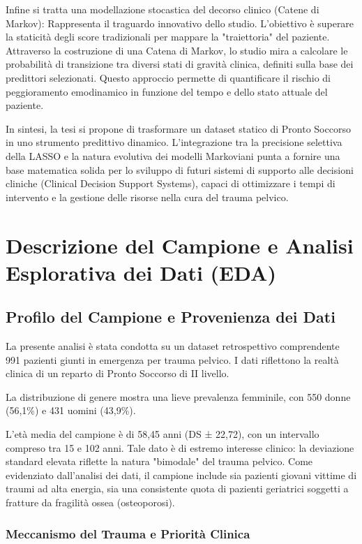\documentclass[11pt, oneside, noexaminfo]{sapthesis}   	%
\begin{document}
Infine si tratta una modellazione stocastica del decorso clinico (Catene di Markov): Rappresenta il traguardo innovativo dello studio. L'obiettivo è superare la staticità degli score tradizionali per mappare la "traiettoria" del paziente. Attraverso la costruzione di una Catena di Markov, lo studio mira a calcolare le probabilità di transizione tra diversi stati di gravità clinica, definiti sulla base dei predittori selezionati. Questo approccio permette di quantificare il rischio di peggioramento emodinamico in funzione del tempo e dello stato attuale del paziente.

In sintesi, la tesi si propone di trasformare un dataset statico di Pronto Soccorso in uno strumento predittivo dinamico. L'integrazione tra la precisione selettiva della LASSO e la natura evolutiva dei modelli Markoviani punta a fornire una base matematica solida per lo sviluppo di futuri sistemi di supporto alle decisioni cliniche (Clinical Decision Support Systems), capaci di ottimizzare i tempi di intervento e la gestione delle risorse nella cura del trauma pelvico.



\chapter{Descrizione del Campione e Analisi Esplorativa dei Dati (EDA)}
\section{Profilo del Campione e Provenienza dei Dati}
La presente analisi è stata condotta su un dataset retrospettivo comprendente 991 pazienti giunti in emergenza per trauma pelvico. I dati riflettono la realtà clinica di un reparto di Pronto Soccorso di II livello.

La distribuzione di genere mostra una lieve prevalenza femminile, con 550 donne (56,1\%) e 431 uomini (43,9\%). 

L’età media del campione è di 58,45 anni (DS ± 22,72), con un intervallo compreso tra 15 e 102 anni. Tale dato è di estremo interesse clinico: la deviazione standard elevata riflette la natura "bimodale" del trauma pelvico. Come evidenziato dall'analisi dei dati, il campione include sia pazienti giovani vittime di traumi ad alta energia, sia una consistente quota di pazienti geriatrici soggetti a fratture da fragilità ossea (osteoporosi).

\subsection{Meccanismo del Trauma e Priorità Clinica}
\end{document}
